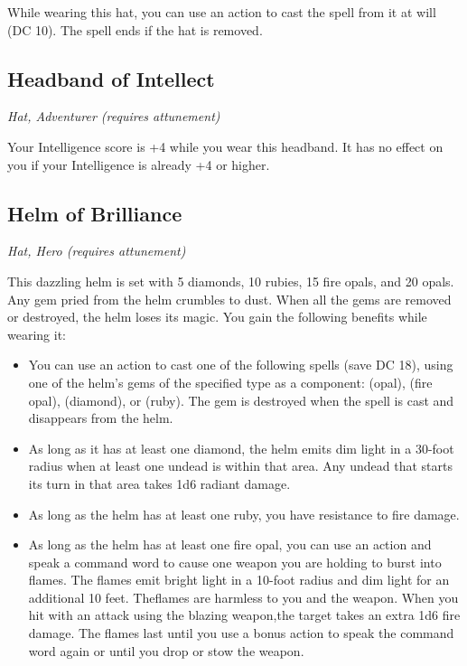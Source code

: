 While wearing this hat, you can use an action to cast the  spell from it at will (DC 10). The spell ends if the hat is removed.

\subsection{Headband of Intellect}
\textit{Hat, Adventurer (requires attunement)}

Your Intelligence score is +4 while you wear this headband. It has no effect on you if your Intelligence is already +4 or higher.

\subsection{Helm of Brilliance}
\textit{Hat, Hero (requires attunement)}

This dazzling helm is set with 5 diamonds, 10 rubies, 15 fire opals, and 20 opals. Any gem pried from the helm crumbles to dust. When all the gems are removed or destroyed, the helm loses its magic. You gain the following benefits while wearing it:
\begin{itemize}
    \item You can use an action to cast one of the following spells (save DC 18), using one of the helm's gems of the specified type as a component:  (opal),  (fire opal),  (diamond), or  (ruby). The gem is destroyed when the spell is cast and disappears from the helm.
    \item As long as it has at least one diamond, the helm emits dim light in a 30-foot radius when at least one undead is within that area. Any undead that starts its turn in that area takes 1d6 radiant damage.
    \item As long as the helm has at least one ruby, you have resistance to fire damage.
    \item As long as the helm has at least one fire opal, you can use an action and speak a command word to cause one weapon you are holding to burst into flames. The flames emit bright light in a 10-foot radius and dim light for an additional 10 feet. Theflames are harmless to you and the weapon. When you hit with an attack using the blazing weapon,the target takes an extra 1d6 fire damage. The flames last until you use a bonus action to speak the command word again or until you drop or stow the weapon.
\end{itemize}

